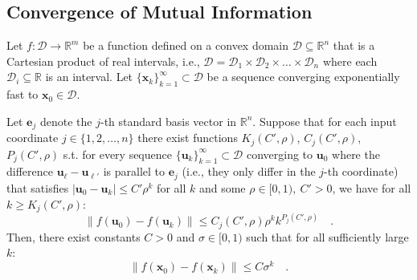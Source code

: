 \documentclass[../../main.tex]{subfiles}
\begin{document}
\subsection{Convergence of Mutual Information}
\begin{theorem}
    \label{theorem:element-wise_exponential_convergence_implies_exponential_convergence}
Let $f: \mathcal{D} \to \mathbb{R}^m$ be a function defined on a convex domain $\mathcal{D} \subseteq \mathbb{R}^n$ that is a Cartesian product of real intervals, i.e., $\mathcal{D} = \mathcal{D}_1 \times \mathcal{D}_2 \times \dots \times \mathcal{D}_n$ where each $\mathcal{D}_i \subseteq \mathbb{R}$ is an interval. Let $\{\bm{x}_k\}_{k=1}^\infty \subset \mathcal{D}$ be a sequence converging exponentially fast to $\bm{x}_0 \in \mathcal{D}$.

Let $\bm{e}_j$ denote the $j$-th standard basis vector in $\mathbb{R}^n$. Suppose that for each input coordinate $j \in \{1, 2, \dots, n\}$ there exist functions $K_j(C', \rho)$, $C_j(C', \rho)$, $P_j(C', \rho)$ s.t. for every sequence $\{\bm{u}_k\}_{k=1}^\infty \subset \mathcal{D}$ converging to $\bm{u}_0$ where the difference $\bm{u}_\ell-\bm{u}_{\ell'}$ is parallel to $\bm{e}_j$ (i.e., they only differ in the $j$-th coordinate) that satisfies $|\bm{u}_0 - \bm{u}_k| \leq C' \rho^k$ for all $k$ and some $\rho \in [0, 1), \ C' > 0$, we have for all $k \geq K_j(C', \rho)$:
\[
    \|f(\bm{u}_0) - f(\bm{u}_k)\| \le C_j(C', \rho) \rho^k k^{P_j(C', \rho)} \quad .
\]
Then, there exist constants $C > 0$ and $\sigma \in [0, 1)$ such that for all sufficiently large $k$:
\[
    \|f(\bm{x}_0) - f(\bm{x}_k)\| \le C \sigma^k \quad .
\]
\end{theorem}
\end{document}
